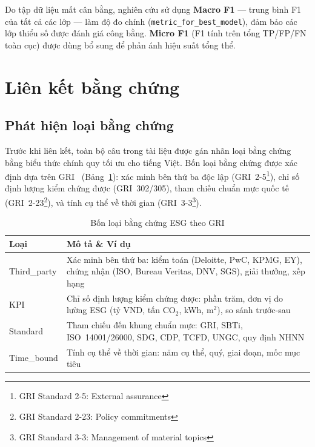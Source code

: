 Do tập dữ liệu mất cân bằng, nghiên cứu sử dụng \textbf{Macro F1} --- trung bình F1 của tất cả các lớp --- làm độ đo chính (\texttt{metric\_for\_best\_model}), đảm bảo các lớp thiểu số được đánh giá công bằng. \textbf{Micro F1} (F1 tính trên tổng TP/FP/FN toàn cục) được dùng bổ sung để phản ánh hiệu suất tổng thể.

\section{Liên kết bằng chứng}
\label{sec:evidence_linking}

\subsection{Phát hiện loại bằng chứng}
\label{subsec:evidence_detection}

Trước khi liên kết, toàn bộ câu trong tài liệu được gán nhãn loại bằng chứng bằng biểu thức chính quy tối ưu cho tiếng Việt. Bốn loại bằng chứng được xác định dựa trên GRI~\cite{gri2021gri} (Bảng~\ref{tab:evidence_hierarchy}): xác minh bên thứ ba độc lập (GRI~2-5\footnote{GRI Standard 2-5: External assurance}), chỉ số định lượng kiểm chứng được (GRI~302/305), tham chiếu chuẩn mực quốc tế (GRI~2-23\footnote{GRI Standard 2-23: Policy commitments}), và tính cụ thể về thời gian (GRI~3-3\footnote{GRI Standard 3-3: Management of material topics}).

\begin{table}[htbp]
\centering
\caption{Bốn loại bằng chứng ESG theo GRI}
\label{tab:evidence_hierarchy}
\small
\renewcommand{\arraystretch}{1.3}
\begin{tabular}{|l|p{10cm}|}
\hline
\textbf{Loại} & \textbf{Mô tả \& Ví dụ} \\
\hline
Third\_party & Xác minh bên thứ ba: kiểm toán (Deloitte, PwC, KPMG, EY), chứng nhận (ISO, Bureau Veritas, DNV, SGS), giải thưởng, xếp hạng \\
\hline
KPI & Chỉ số định lượng kiểm chứng được: phần trăm, đơn vị đo lường ESG (tỷ VND, tấn CO$_2$, kWh, m$^2$), so sánh trước-sau \\
\hline
Standard & Tham chiếu đến khung chuẩn mực: GRI, SBTi, ISO~14001/26000, SDG, CDP, TCFD, UNGC, quy định NHNN \\
\hline
Time\_bound & Tính cụ thể về thời gian: năm cụ thể, quý, giai đoạn, mốc mục tiêu \\
\hline
\end{tabular}
\end{table}

